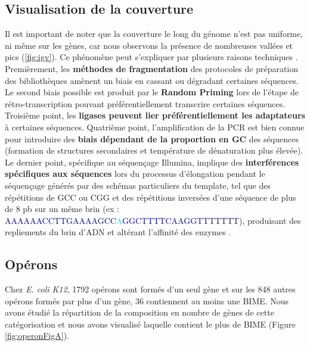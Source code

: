 \documentclass[12pt,a4paper]{report}
\begin{document}
\begin{onehalfspace}
\subsection*{Visualisation de la couverture}
\label{uniformite_couverture}
Il est important de noter que la couverture le long du génome n'est pas uniforme, ni même sur les gènes, car nous observons la présence de nombreuses vallées et pics (\autoref{fig:igv}). Ce phénomène peut s'expliquer par plusieurs raisons techniques \citep{Li2013}. Premièrement, les \textbf{méthodes de fragmentation} des protocoles de préparation des bibliothèques amènent un biais en cassant ou dégradant certaines séquences. Le second biais possible est produit par le \textbf{Random Priming} lors de l'étape de rétro-transcription pouvant préférentiellement transcrire certaines séquences. Troisième point, les \textbf{ligases peuvent lier préférentiellement les adaptateurs} à certaines séquences. Quatrième point, l'amplification de la PCR est bien connue pour introduire des \textbf{biais dépendant de la proportion en GC} des séquences (formation de structures secondaires et température de dénaturation plus élevée). Le dernier point, spécifique au séquençage Illumina, implique des \textbf{interférences spécifiques aux séquences} lors du processus d'élongation pendant le séquençage générés par des schémas particuliers du template, tel que des répétitions de GCC ou CGG et des répétitions inversées d'une séquence de plus de 8 pb sur un même brin (ex : \textcolor{blue}{AAAAAACCTTGAAAAGCC}\textcolor{cyan}{A}\textcolor{blue}{GGCTTTTCAAGGTTTTTTT}), produisant des repliements du brin d'ADN et altérant l'affinité des enzymes \citep{Nakamura2011}.

\subsection*{Opérons}
Chez \textit{E. coli K12}, 1792 opérons sont formés d'un seul gène et sur les 848 autres opérons formés par plus d'un gène, 36 contiennent au moins une BIME. Nous avons étudié la répartition de la composition en nombre de gènes de cette catégorisation et nous avons visualisé laquelle contient le plus de BIME (Figure \autoref{fig:operonFigA}).


\end{onehalfspace}
\end{document}
